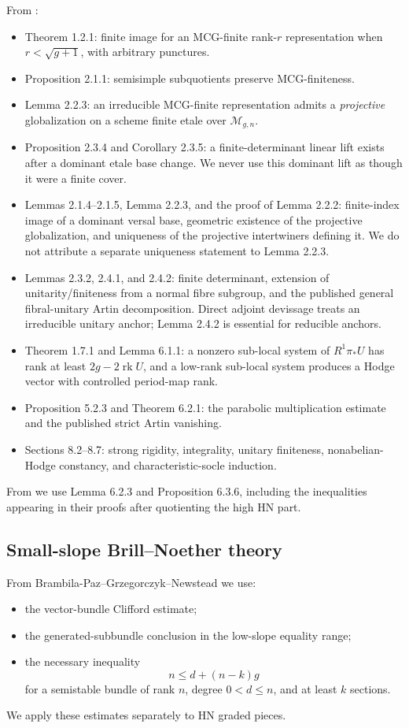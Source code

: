 \documentclass[11pt]{article}
\theoremstyle{definition}
\newcommand{\Mcal}{\mathcal M}
\newcommand{\rk}{\operatorname{rk}}
\begin{document}
From \cite{LLCan}:
\begin{itemize}
\item Theorem 1.2.1: finite image for an MCG-finite rank-$r$ representation
when $r<\sqrt{g+1}$, with arbitrary punctures.
\item Proposition 2.1.1: semisimple subquotients preserve MCG-finiteness.
\item Lemma 2.2.3: an irreducible MCG-finite representation admits a
\emph{projective} globalization on a scheme finite etale over $\Mcal_{g,n}$.
\item Proposition 2.3.4 and Corollary 2.3.5: a finite-determinant linear lift
exists after a dominant etale base change.  We never use this dominant lift
as though it were a finite cover.
\item Lemmas 2.1.4--2.1.5, Lemma 2.2.3, and the proof of Lemma 2.2.2:
finite-index image of a dominant versal base, geometric existence of the
projective globalization, and uniqueness of the projective intertwiners
defining it.  We do not attribute a separate uniqueness statement to
Lemma 2.2.3.
\item Lemmas 2.3.2, 2.4.1, and 2.4.2: finite determinant, extension of
unitarity/finiteness from a normal fibre subgroup, and the published general
fibral-unitary Artin decomposition.  Direct adjoint devissage treats an
irreducible unitary anchor; Lemma 2.4.2 is essential for reducible anchors.
\item Theorem 1.7.1 and Lemma 6.1.1: a nonzero sub-local system of
$R^1\pi_*U$ has rank at least $2g-2\rk U$, and a low-rank sub-local system
produces a Hodge vector with controlled period-map rank.
\item Proposition 5.2.3 and Theorem 6.2.1: the parabolic multiplication
estimate and the published strict Artin vanishing.
\item Sections 8.2--8.7: strong rigidity, integrality, unitary finiteness,
nonabelian-Hodge constancy, and characteristic-socle induction.
\end{itemize}

From \cite{LLGeo} we use Lemma 6.2.3 and Proposition 6.3.6, including the
inequalities appearing in their proofs after quotienting the high HN part.

\subsection{Small-slope Brill--Noether theory}

From Brambila-Paz--Grzegorczyk--Newstead \cite{BPGN} we use:
\begin{itemize}
\item the vector-bundle Clifford estimate;
\item the generated-subbundle conclusion in the low-slope equality range;
\item the necessary inequality
\[
 n\le d+(n-k)g
\]
for a semistable bundle of rank $n$, degree $0<d\le n$, and at least $k$
sections.
\end{itemize}
We apply these estimates separately to HN graded pieces.
\end{document}
